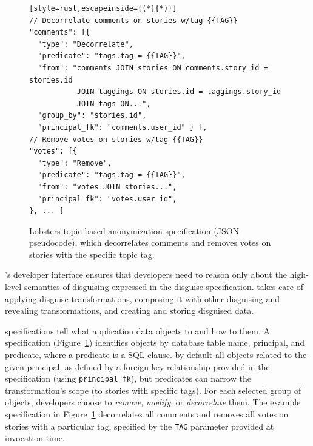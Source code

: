 \begin{figure}[t]
\centering
\begin{lstlisting}[style=rust,escapeinside={(*}{*)}]
// Decorrelate comments on stories w/tag {{TAG}}
"comments": [{
  "type": "Decorrelate",
  "predicate": "tags.tag = {{TAG}}",
  "from": "comments JOIN stories ON comments.story_id = stories.id
           JOIN taggings ON stories.id = taggings.story_id
           JOIN tags ON...",
  "group_by": "stories.id",
  "principal_fk": "comments.user_id" } ],
// Remove votes on stories w/tag {{TAG}}
"votes": [{
  "type": "Remove",
  "predicate": "tags.tag = {{TAG}}",
  "from": "votes JOIN stories...",
  "principal_fk": "votes.user_id",
}, ... ]
\end{lstlisting}
    \caption[Lobsters topic-based anonymization disguise specification.]{Lobsters topic-based anonymization \xx specification (JSON
    pseudocode), which decorrelates comments and removes votes on stories with
    the specific topic tag.}
\label{f:spec}
\end{figure}


\sys's developer interface ensures that developers need to reason only
about the high-level semantics of disguising expressed in the disguise
specification. \sys takes care of applying disguise transformations, composing
it with other disguising and revealing transformations, and creating and storing
disguised data.


\Xx specifications tell \sys what application data objects to \xx and how to \xx them.
%
A \xx specification (Figure~\ref{f:spec}) identifies objects by database table name, principal, and
predicate, where a predicate is a SQL  clause.
%
\sys by default \xxs all objects related to the given principal, as defined by
a foreign-key relationship provided in the \xx specification (using
\texttt{principal\_fk}), but predicates can narrow the transformation's scope
(\eg to stories with specific tags).
%
For each selected group of objects, developers choose to
\emph{remove}, \emph{modify}, or \emph{decorrelate} them.
%
The example specification in Figure~\ref{f:spec} decorrelates all comments and
removes all votes on stories with a particular tag, specified by the
\texttt{TAG} parameter provided at invocation time.
%
%


